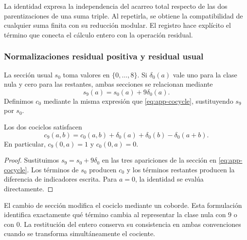 La identidad expresa la independencia del acarreo total respecto de las dos parentizaciones de una suma triple. Al repetirla, se obtiene la compatibilidad de cualquier suma finita con su reducción modular. El registro hace explícito el término que conecta el cálculo entero con la operación residual.

\subsubsection{Normalizaciones residual positiva y residual usual}

La sección usual $s_0$ toma valores en $\{0,\ldots,8\}$. Si $\delta_0(a)$ vale uno para la clase nula y cero para las restantes, ambas secciones se relacionan mediante
\begin{equation}
 s_9(a)=s_0(a)+9\delta_0(a).
\end{equation}
Definimos $c_0$ mediante la misma expresión que \eqref{eq:app-cocycle}, sustituyendo $s_9$ por $s_0$.

\begin{bloqueindivisible}
\begin{proposicion}
\label{prop:app-cambio-seccion}
Los dos cociclos satisfacen
\begin{equation}
 c_9(a,b)=c_0(a,b)+\delta_0(a)+\delta_0(b)-\delta_0(a+b).
 \label{eq:app-section-change}
\end{equation}
En particular, $c_9(0,a)=1$ y $c_0(0,a)=0$.
\end{proposicion}

\begin{proof}
Sustituimos $s_9=s_0+9\delta_0$ en las tres apariciones de la sección en \eqref{eq:app-cocycle}. Los términos de $s_0$ producen $c_0$ y los términos restantes producen la diferencia de indicadores escrita. Para $a=0$, la identidad se evalúa directamente.
\end{proof}
\end{bloqueindivisible}

El cambio de sección modifica el cociclo mediante un coborde. Esta formulación identifica exactamente qué término cambia al representar la clase nula con $9$ o con $0$. La restitución del entero conserva su consistencia en ambas convenciones cuando se transforma simultáneamente el cociente.

